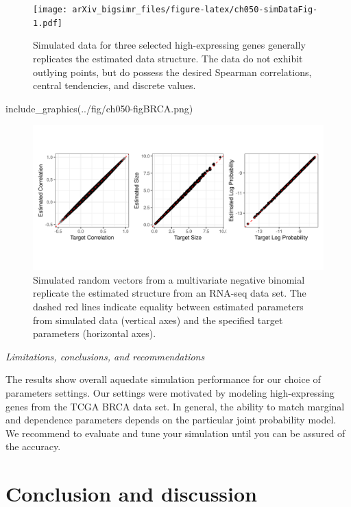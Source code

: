 \documentclass{article}
\newenvironment{Shaded}{\begin{snugshade}}{\end{snugshade}}
\newcommand{\FunctionTok}[1]{\textcolor[rgb]{0.00,0.00,0.00}{#1}}
\newcommand{\NormalTok}[1]{#1}
\newcommand{\StringTok}[1]{\textcolor[rgb]{0.31,0.60,0.02}{#1}}
\begin{document}
\begin{figure}
\centering
\texttt{[image: arXiv\_bigsimr\_files/figure-latex/ch050-simDataFig-1.pdf]}
\caption{Simulated data for three selected high-expressing genes
generally replicates the estimated data structure. The data do not
exhibit outlying points, but do possess the desired Spearman
correlations, central tendencies, and discrete values.}
\end{figure}

\begin{Shaded}
\begin{Highlighting}[]
\FunctionTok{include\_graphics}\NormalTok{(}\StringTok{\textquotesingle{}../fig/ch050{-}figBRCA.png\textquotesingle{}}\NormalTok{)}
\end{Highlighting}
\end{Shaded}

\begin{figure}
\includegraphics[width=0.8\linewidth]{../fig/ch050-figBRCA} \caption{Simulated random vectors from a multivariate negative binomial replicate the estimated structure from an RNA-seq data set. The dashed red lines indicate equality between estimated parameters from simulated data (vertical axes) and the specified target parameters (horizontal axes).}\label{fig:ch050-figBRCA}
\end{figure}

\emph{Limitations, conclusions, and recommendations}

The results show overall aquedate simulation performance for our choice
of parameters settings. Our settings were motivated by modeling
high-expressing genes from the TCGA BRCA data set. In general, the
ability to match marginal and dependence parameters depends on the
particular joint probability model. We recommend to evaluate and tune
your simulation until you can be assured of the accuracy.

\hypertarget{discussion}{%
\section{Conclusion and discussion}\label{discussion}}
\end{document}
